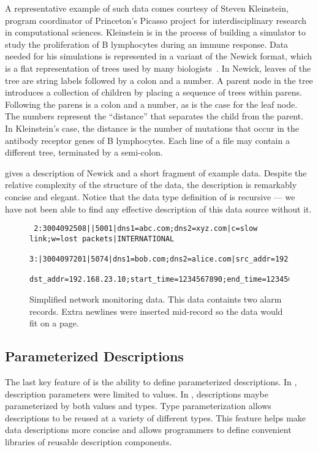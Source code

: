 A representative example of such data comes courtesy of Steven
Kleinstein, program coordinator of Princeton's Picasso project for
interdisciplinary research in computational sciences.  Kleinstein is
in the process of building a simulator to study the
proliferation of B lymphocytes during an immune response.  Data
needed for his simulations is represented in a variant of the
Newick format, which is a flat
representation of trees used by 
many biologists~\cite{newick}.  In Newick, 
leaves of the tree are string labels followed by a colon and a number.
A parent node in the tree introduces a collection of children by
placing a sequence of trees within parens.  Following the parens is a
colon and a number, as is the case for the leaf node.
The numbers represent the ``distance'' 
that separates the child from the parent.  In
Kleinstein's case, the distance is the number of mutations that occur
in the antibody receptor genes of B lymphocytes.   Each line
of a file may contain a different tree, terminated by a semi-colon.

 gives a description of Newick and a short fragment 
of example data.  Despite the relative complexity of the structure of the data,
the description is remarkably concise and elegant.  Notice that the data type
definition of  is recursive --- we have not been able to find any
effective description of this data source without it.

\begin{figure}
  \centering
  \small
\begin{verbatim}
 2:3004092508||5001|dns1=abc.com;dns2=xyz.com|c=slow link;w=lost packets|INTERNATIONAL
 3:|3004097201|5074|dns1=bob.com;dns2=alice.com|src_addr=192.168.0.10;
 dst_addr=192.168.23.10;start_time=1234567890;end_time=1234568000;cycle_time=17412|SPECIAL
\end{verbatim}  
  \caption{Simplified network monitoring data.  This 
data containts two alarm records.  Extra newlines 
were inserted mid-record so the data would fit on a page.}
  \label{fig:darkstar-records}
\end{figure}

\subsection{Parameterized Descriptions}

The last key feature of \datatype{} is the ability to define
parameterized descriptions.  In \pads, description parameters
were limited to values.  In \datatype, descriptions
maybe parameterized by both values and types.  Type parameterization
allows descriptions to be
reused at a variety of different types.  This feature 
helps make data descriptions
more concise and allows programmers to define convenient libraries
of reusable description components.

